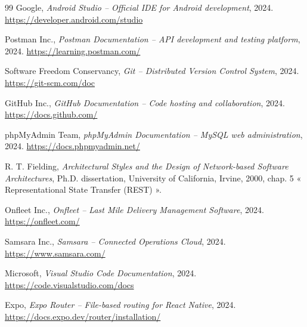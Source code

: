 \documentclass[12pt,a4paper]{article}
\begin{document}
\begin{thebibliography}{99}
    Google, \textit{Android Studio -- Official IDE for Android development}, 2024. \url{https://developer.android.com/studio}

    Postman Inc., \textit{Postman Documentation -- API development and testing platform}, 2024. \url{https://learning.postman.com/}

    Software Freedom Conservancy, \textit{Git -- Distributed Version Control System}, 2024. \url{https://git-scm.com/doc}

    GitHub Inc., \textit{GitHub Documentation -- Code hosting and collaboration}, 2024. \url{https://docs.github.com/}

    phpMyAdmin Team, \textit{phpMyAdmin Documentation -- MySQL web administration}, 2024. \url{https://docs.phpmyadmin.net/}

    R. T. Fielding, \textit{Architectural Styles and the Design of Network-based Software Architectures}, Ph.D. dissertation, University of California, Irvine, 2000, chap. 5 « Representational State Transfer (REST) ».

    Onfleet Inc., \textit{Onfleet -- Last Mile Delivery Management Software}, 2024. \url{https://onfleet.com/}

    Samsara Inc., \textit{Samsara -- Connected Operations Cloud}, 2024. \url{https://www.samsara.com/}

    Microsoft, \textit{Visual Studio Code Documentation}, 2024. \url{https://code.visualstudio.com/docs}

    Expo, \textit{Expo Router -- File-based routing for React Native}, 2024. \url{https://docs.expo.dev/router/installation/}

    \end{thebibliography}

    
\end{document}
